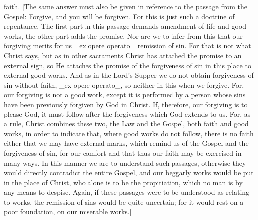 faith.  [The same answer must also be given in reference to the
passage from the Gospel: Forgive, and you will be forgiven.  For this
is just such a doctrine of repentance.  The first part in this
passage demands amendment of life and good works, the other part adds
the promise.  Nor are we to infer from this that our forgiving merits
for us _ex opere operato_ remission of sin.  For that is not what
Christ says, but as in other sacraments Christ has attached the
promise to an external sign, so He attaches the promise of the
forgiveness of sin in this place to external good works.  And as in
the Lord's Supper we do not obtain forgiveness of sin without faith,
_ex opere operato_, so neither in this when we forgive.  For, our
forgiving is not a good work, except it is performed by a person
whose sins have been previously forgiven by God in Christ.  If,
therefore, our forgiving is to please God, it must follow after the
forgiveness which God extends to us.  For, as a rule, Christ combines
these two, the Law and the Gospel, both faith and good works, in
order to indicate that, where good works do not follow, there is no
faith either that we may have external marks, which remind us of the
Gospel and the forgiveness of sin, for our comfort and that thus our
faith may be exercised in many ways.  In this manner we are to
understand such passages, otherwise they would directly contradict
the entire Gospel, and our beggarly works would be put in the place
of Christ, who alone is to be the propitiation, which no man is by
any means to despise.  Again, if these passages were to be understood
as relating to works, the remission of sins would be quite uncertain;
for it would rest on a poor foundation, on our miserable works.]

